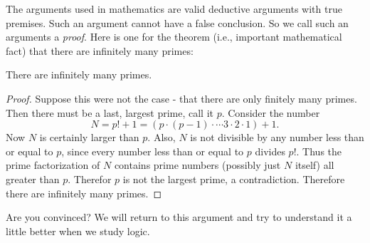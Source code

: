 The arguments used in mathematics are valid deductive arguments with true premises.  Such an argument cannot have a false conclusion.  So we call such an arguments a {\em proof}.  Here is one for the theorem (i.e., important mathematical fact) that there are infinitely many primes:

\begin{theorem}
 There are infinitely many primes.
\end{theorem}

\begin{proof}
 Suppose this were not the case - that there are only finitely many primes.  Then there must be a last, largest prime, call it $p$. Consider the number 
 \[N = p! + 1 = (p \cdot (p-1) \cdot \cdots 3\cdot 2 \cdot 1) + 1.\]
 Now $N$ is certainly larger than $p$.  Also, $N$ is not divisible by any number less than or equal to $p$, since every number less than or equal to $p$ divides $p!$.  Thus the prime factorization of $N$ contains prime numbers (possibly just $N$ itself) all greater than $p$.  Therefor $p$ is not the largest prime, a contradiction.  Therefore there are infinitely many primes.
\end{proof}

Are you convinced?  We will return to this argument and try to understand it a little better when we study logic. 

